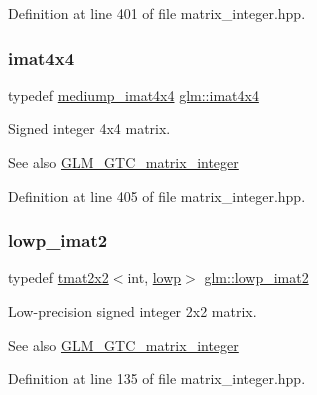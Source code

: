 Definition at line 401 of file matrix\+\_\+integer.\+hpp.

\mbox{\label{group__gtc__matrix__integer_ga367d8d5281ff82f1215a227dd2ea5ba9}} 
\subsubsection{\texorpdfstring{imat4x4}{imat4x4}}
{\footnotesize\ttfamily typedef \mbox{\hyperlink{group__gtc__matrix__integer_gae226af929e72730be59a58d89a4be028}{mediump\+\_\+imat4x4}} \mbox{\hyperlink{group__gtc__matrix__integer_ga367d8d5281ff82f1215a227dd2ea5ba9}{glm\+::imat4x4}}}

Signed integer 4x4 matrix. \begin{DoxySeeAlso}{See also}
\mbox{\hyperlink{group__gtc__matrix__integer}{G\+L\+M\+\_\+\+G\+T\+C\+\_\+matrix\+\_\+integer}} 
\end{DoxySeeAlso}


Definition at line 405 of file matrix\+\_\+integer.\+hpp.

\mbox{\label{group__gtc__matrix__integer_ga4840a4d8b9e8997f1173da9e8e5e4de4}} 
\subsubsection{\texorpdfstring{lowp\_imat2}{lowp\_imat2}}
{\footnotesize\ttfamily typedef \mbox{\hyperlink{structglm_1_1tmat2x2}{tmat2x2}}$<$int, \mbox{\hyperlink{namespaceglm_a0f04f086094c747d227af4425893f545ae161af3fc695e696ce3bf69f7332bc2d}{lowp}}$>$ \mbox{\hyperlink{group__gtc__matrix__integer_ga4840a4d8b9e8997f1173da9e8e5e4de4}{glm\+::lowp\+\_\+imat2}}}

Low-\/precision signed integer 2x2 matrix. \begin{DoxySeeAlso}{See also}
\mbox{\hyperlink{group__gtc__matrix__integer}{G\+L\+M\+\_\+\+G\+T\+C\+\_\+matrix\+\_\+integer}} 
\end{DoxySeeAlso}


Definition at line 135 of file matrix\+\_\+integer.\+hpp.

\mbox{\label{group__gtc__matrix__integer_gad1950bd75bc033e8511cec3deb15af56}} 
